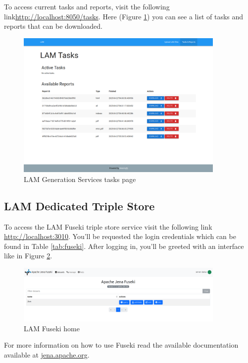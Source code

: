 To access current tasks and reports, visit the following link\url{http://localhost:8050/tasks}.
Here (Figure \ref{fig:lam-generation-ui-tasks}) you can see a list of tasks and reports that can be downloaded.

\begin{figure}[H]
  \centering
  \includegraphics[width=0.9\textwidth]{images/usage/lam-generation-ui-tasks.png}
  \caption{LAM Generation Services tasks page}
  \label{fig:lam-generation-ui-tasks}
\end{figure}

\subsection{LAM Dedicated Triple Store}
To access the LAM Fuseki triple store service visit the following link \url{http://localhost:3010}. You'll be requested the login credentials which can be found in Table \ref{tab:fuseki}. After logging in, you'll be greeted with an interface like in Figure \ref{fig:lam-fuseki-home}.

\begin{figure}[H]
  \centering
  \includegraphics[width=0.9\textwidth]{images/usage/fuseki-home.png}
  \caption{LAM Fuseki home}
  \label{fig:lam-fuseki-home}
\end{figure} 

For more information on how to use Fuseki read the available documentation available at \href{https://jena.apache.org/documentation/fuseki2/}{jena.apache.org}.